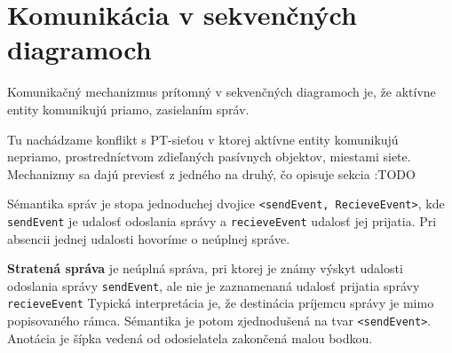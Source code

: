 \section{Komunikácia v sekvenčných diagramoch}

Komunikačný mechanizmus prítomný v sekvenčných diagramoch je, že aktívne entity komunikujú priamo, zasielaním správ. 
\begin{note}
	Tu nachádzame konflikt s PT-sieťou v ktorej aktívne entity komunikujú nepriamo, prostredníctvom zdieľaných pasívnych objektov, miestami siete. Mechanizmy sa dajú previesť z jedného na druhý, čo opisuje sekcia :TODO
\end{note}
Sémantika správ je stopa jednoduchej dvojice \lstinline{<sendEvent, RecieveEvent>}, kde \lstinline{sendEvent} je udalosť odoslania správy a \lstinline{recieveEvent} udalosť jej prijatia. Pri absencii jednej udalosti hovoríme o neúplnej správe.

\begin{defn}
	\textbf{Stratená správa} je neúplná správa, pri ktorej je známy výskyt udalosti odoslania správy \lstinline{sendEvent}, ale nie je zaznamenaná udalosť prijatia správy \lstinline{recieveEvent} 
	Typická interpretácia je, že destinácia príjemcu správy je mimo popisovaného rámca. Sémantika je potom zjednodušená na tvar 
	\lstinline{<sendEvent>}.
	Anotácia je šípka vedená od odosielatela zakončená malou bodkou.
\end{defn}


